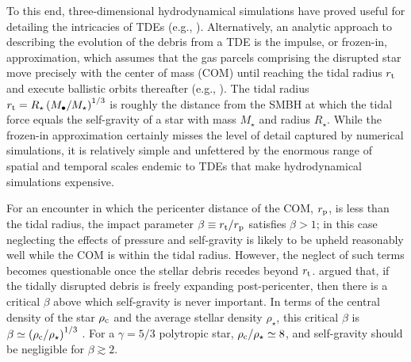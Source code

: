 \documentclass[twocolumn]{aastex62}
\begin{document}
To this end, three-dimensional hydrodynamical simulations have proved useful for detailing the intricacies of TDEs (e.g., \citealt{bicknell83, evans89, laguna93, lodato09, guillochon13, hayasaki13,coughlin15,mainetti17,golightly19a, miles20, law-smith20}). Alternatively, an analytic approach to describing the evolution of the debris from a TDE is the impulse, or frozen-in, approximation, which assumes that the gas parcels comprising the disrupted star move precisely with the center of mass (COM) until reaching the tidal radius $r_{\rm t}$ and execute ballistic orbits thereafter (e.g., \citealt{lacy82, lodato09, stone13,coughlin19}). The tidal radius $r_{\rm t} = R_{\star}\left(M_{\bullet}/M_{\star}\right)^{1/3}$ is roughly the distance from the SMBH at which the tidal force equals the self-gravity of a star with mass $M_{\star}$ and radius $R_{\star}$. While the frozen-in approximation certainly misses the level of detail captured by numerical simulations, it is relatively simple and unfettered by the enormous range of spatial and temporal scales endemic to TDEs that make hydrodynamical simulations expensive.

For an encounter in which the pericenter distance of the COM, $r_{\rm p}$, is less than the tidal radius, the impact parameter $\beta \equiv r_{\rm t}/r_{\rm p}$ satisfies $\beta > 1$; in this case neglecting the effects of pressure and self-gravity is likely to be upheld reasonably well while the COM is within the tidal radius. However, the neglect of such terms becomes questionable once the stellar debris recedes beyond $r_{\rm t}$. \citet{kochanek94} argued that, if the tidally disrupted debris is freely expanding post-pericenter, then there is a critical $\beta$ above which self-gravity is never important. In terms of the central density of the star $\rho_{\rm c}$ and the average stellar density $\rho_{\star}$, this critical $\beta$ is $\beta \simeq \left(\rho_{\rm c}/\rho_{\star}\right)^{1/3}$ \citep{steinberg19}. For a $\gamma = 5/3$ polytropic star, $\rho_{\rm c}/\rho_{\star} \simeq 8$, and self-gravity should be negligible for $\beta \gtrsim 2$. 
\end{document}
